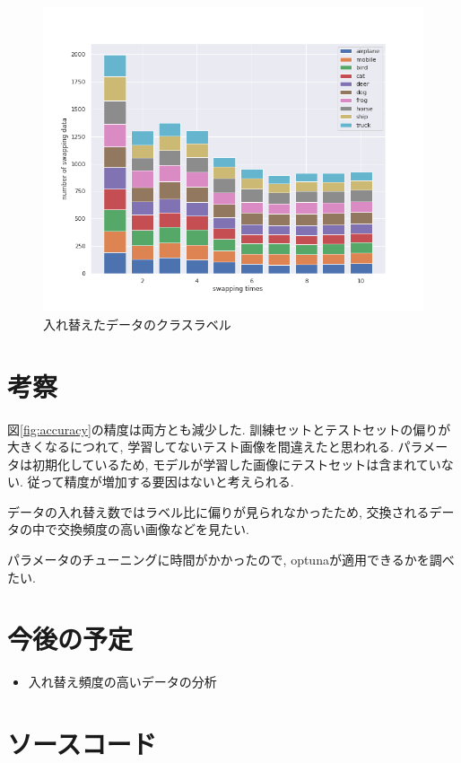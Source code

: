 \documentclass[twocolumn]{jarticle}     %
\begin{document}
\begin{figure}[tb]
  \begin{center}
    \includegraphics[clip,width=16.5cm]{swapclass.png}
    \caption{入れ替えたデータのクラスラベル}
    \label{fig:class}
  \end{center}
\end{figure}

\section{考察}
図\ref{fig:accuracy}の精度は両方とも減少した. 訓練セットとテストセットの偏りが大きくなるにつれて, 学習してないテスト画像を間違えたと思われる. パラメータは初期化しているため, モデルが学習した画像にテストセットは含まれていない. 従って精度が増加する要因はないと考えられる.

データの入れ替え数ではラベル比に偏りが見られなかったため, 交換されるデータの中で交換頻度の高い画像などを見たい.

パラメータのチューニングに時間がかかったので, optunaが適用できるかを調べたい.

\section{今後の予定}
\begin{itemize}
	\item {入れ替え頻度の高いデータの分析}
\end{itemize}

\section{ソースコード}





\end{document}
